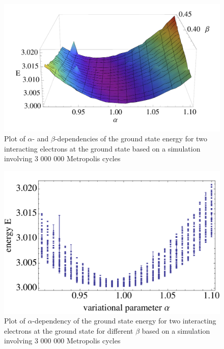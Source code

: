 \begin{figure}[htbp]
    \centering
    \includegraphics[scale=0.6]{2electron}
    \caption{Plot of $\alpha$- and $\beta$-dependencies of the ground state energy for two interacting electrons at the ground state based on a simulation involving 3 000 000 Metropolis cycles}
    \label{fig:2electron}
\end{figure}
\begin{figure}[htbp]
    \centering
    \includegraphics[scale=0.6]{2electronalpha}
    \caption{Plot of $\alpha$-dependency of the ground state energy for two interacting electrons at the ground state for different $\beta$ based on a simulation involving 3 000 000 Metropolis cycles}
    \label{fig:2electronalpha}
\end{figure}
\FloatBarrier
